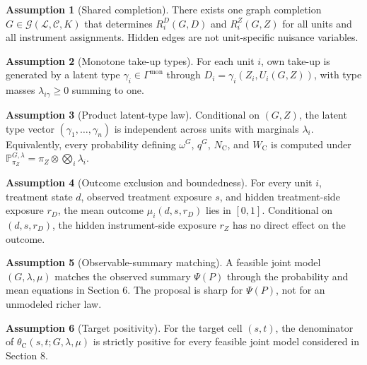 \documentclass[11pt]{article}
\renewcommand{\Pr}{\mathbb{P}}
\newcommand{\calG}{\mathcal{G}}
\newcommand{\PsiObs}{\Psi}
\theoremstyle{definition}
\newtheorem{assumption}{Assumption}
\theoremstyle{plain}
\theoremstyle{remark}
\begin{document}
\begin{assumption}[Shared completion]\label{ass:shared}
There exists one graph completion \(G\in\calG(\mathcal L,\mathcal C,K)\) that
determines \(R_i^D(G,D)\) and \(R_i^Z(G,Z)\) for all units and all instrument
assignments. Hidden edges are not unit-specific nuisance variables.
\end{assumption}

\begin{assumption}[Monotone take-up types]\label{ass:mono}
For each unit \(i\), own take-up is generated by a latent type
\(\gamma_i\in\Gamma^{\mathrm{mon}}\) through
\(D_i=\gamma_i(Z_i,U_i(G,Z))\), with type masses
\(\lambda_{i\gamma}\ge0\) summing to one.
\end{assumption}

\begin{assumption}[Product latent-type law]\label{ass:product-law}
Conditional on \((G,Z)\), the latent type vector
\((\gamma_1,\ldots,\gamma_n)\) is independent across units with marginals
\(\lambda_i\). Equivalently, every probability defining \(\omega^G\),
\(q^G\), \(N_{\mathrm{C}}\), and \(W_{\mathrm{C}}\) is computed under
\(\Pr^{G,\lambda}_{\pi_Z}=\pi_Z\otimes\bigotimes_i\lambda_i\).
\end{assumption}

\begin{assumption}[Outcome exclusion and boundedness]\label{ass:outcome}
For every unit \(i\), treatment state \(d\), observed treatment exposure \(s\),
and hidden treatment-side exposure \(r_D\), the mean outcome
\(\mu_i(d,s,r_D)\) lies in \([0,1]\). Conditional on \((d,s,r_D)\), the hidden
instrument-side exposure \(r_Z\) has no direct effect on the outcome.
\end{assumption}

\begin{assumption}[Observable-summary matching]\label{ass:matching}
A feasible joint model \((G,\lambda,\mu)\) matches the observed summary
\(\PsiObs(P)\) through the probability and mean equations in Section 6. The
proposal is sharp for \(\PsiObs(P)\), not for an unmodeled richer law.
\end{assumption}

\begin{assumption}[Target positivity]\label{ass:positivity}
For the target cell \((s,t)\), the denominator of
\(\theta_{\mathrm{C}}(s,t;G,\lambda,\mu)\) is strictly positive for every
feasible joint model considered in Section 8.
\end{assumption}
\end{document}
